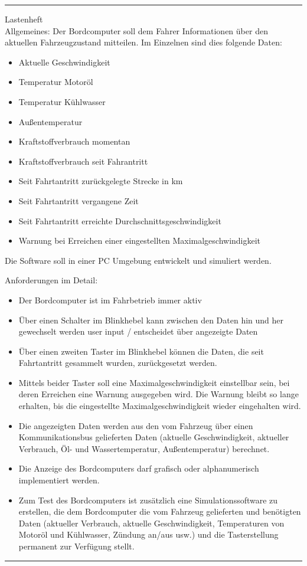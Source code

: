 \documentclass[a4paper,12pt]{article}
\begin{document}
\noindent\rule{16cm}{0.4pt}
Lastenheft\\

Allgemeines:
Der Bordcomputer soll dem Fahrer Informationen über den aktuellen Fahrzeugzustand mitteilen. Im Einzelnen sind dies folgende Daten:

\begin{itemize}

\item Aktuelle Geschwindigkeit 
\item Temperatur Motoröl
\item Temperatur Kühlwasser
\item Außentemperatur 
\item Kraftstoffverbrauch momentan 
\item Kraftstoffverbrauch seit Fahrantritt
\item Seit Fahrtantritt zurückgelegte Strecke in km
\item Seit Fahrtantritt vergangene Zeit
\item Seit Fahrtantritt erreichte Durchschnittsgeschwindigkeit 
\item Warnung bei Erreichen einer eingestellten Maximalgeschwindigkeit

\end{itemize}
 
Die Software soll in einer PC Umgebung entwickelt und simuliert werden.

Anforderungen im Detail:

\begin{itemize}

\item Der Bordcomputer ist im Fahrbetrieb immer aktiv 
\item Über einen Schalter im Blinkhebel kann zwischen den Daten hin und her gewechselt werden 
user input / entscheidet über angezeigte Daten
\item Über einen zweiten Taster im Blinkhebel können die Daten, die seit Fahrtantritt gesammelt wurden, zurückgesetzt werden.
\item Mittels beider Taster soll eine Maximalgeschwindigkeit einstellbar sein, bei deren Erreichen eine Warnung ausgegeben wird. Die Warnung bleibt so lange erhalten, bis die eingestellte Maximalgeschwindigkeit wieder eingehalten wird.
\item Die angezeigten Daten werden aus den vom Fahrzeug über einen Kommunikations­bus gelieferten Daten (aktuelle Geschwindigkeit, aktueller Verbrauch, Öl- und Wassertemperatur, Außentemperatur) berechnet. 
\item Die Anzeige des Bordcomputers darf grafisch oder alphanumerisch implementiert werden.
\item Zum Test des Bordcomputers ist zusätzlich eine Simulationssoftware zu erstellen, die dem Bordcomputer die vom Fahrzeug gelieferten und benötigten Daten (aktueller Verbrauch, aktuelle Geschwindigkeit, Temperaturen von Motoröl und Kühlwasser, Zündung an/aus usw.) und die Tasterstellung permanent zur Verfügung stellt.

\end{itemize}
\noindent\rule{16cm}{0.4pt}
\end{document}
